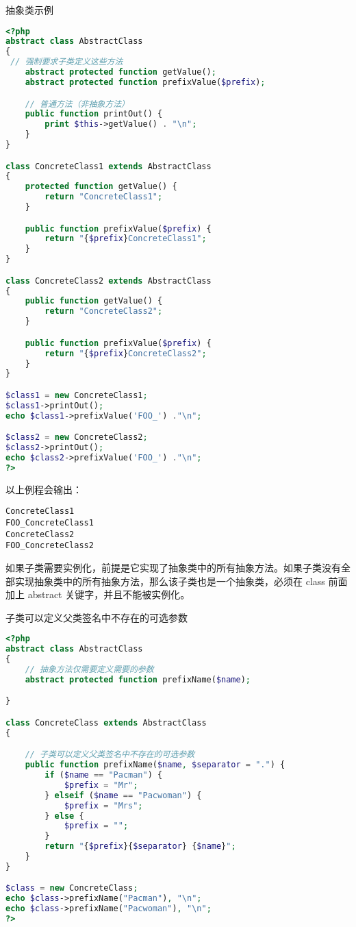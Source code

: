 \begin{example}
抽象类示例
\begin{lstlisting}[language=PHP]
<?php
abstract class AbstractClass
{
 // 强制要求子类定义这些方法
    abstract protected function getValue();
    abstract protected function prefixValue($prefix);

    // 普通方法（非抽象方法）
    public function printOut() {
        print $this->getValue() . "\n";
    }
}

class ConcreteClass1 extends AbstractClass
{
    protected function getValue() {
        return "ConcreteClass1";
    }

    public function prefixValue($prefix) {
        return "{$prefix}ConcreteClass1";
    }
}

class ConcreteClass2 extends AbstractClass
{
    public function getValue() {
        return "ConcreteClass2";
    }

    public function prefixValue($prefix) {
        return "{$prefix}ConcreteClass2";
    }
}

$class1 = new ConcreteClass1;
$class1->printOut();
echo $class1->prefixValue('FOO_') ."\n";

$class2 = new ConcreteClass2;
$class2->printOut();
echo $class2->prefixValue('FOO_') ."\n";
?>
\end{lstlisting}
\end{example}

以上例程会输出：

\begin{verbatim}
ConcreteClass1
FOO_ConcreteClass1
ConcreteClass2
FOO_ConcreteClass2
\end{verbatim}

如果子类需要实例化，前提是它实现了抽象类中的所有抽象方法。如果子类没有全部实现抽象类中的所有抽象方法，那么该子类也是一个抽象类，必须在 class 前面加上 abstract 关键字，并且不能被实例化。

\begin{example}
子类可以定义父类签名中不存在的可选参数
\begin{lstlisting}[language=PHP]
<?php
abstract class AbstractClass
{
    // 抽象方法仅需要定义需要的参数
    abstract protected function prefixName($name);

}

class ConcreteClass extends AbstractClass
{

    // 子类可以定义父类签名中不存在的可选参数
    public function prefixName($name, $separator = ".") {
        if ($name == "Pacman") {
            $prefix = "Mr";
        } elseif ($name == "Pacwoman") {
            $prefix = "Mrs";
        } else {
            $prefix = "";
        }
        return "{$prefix}{$separator} {$name}";
    }
}

$class = new ConcreteClass;
echo $class->prefixName("Pacman"), "\n";
echo $class->prefixName("Pacwoman"), "\n";
?>
\end{lstlisting}
\end{example}

